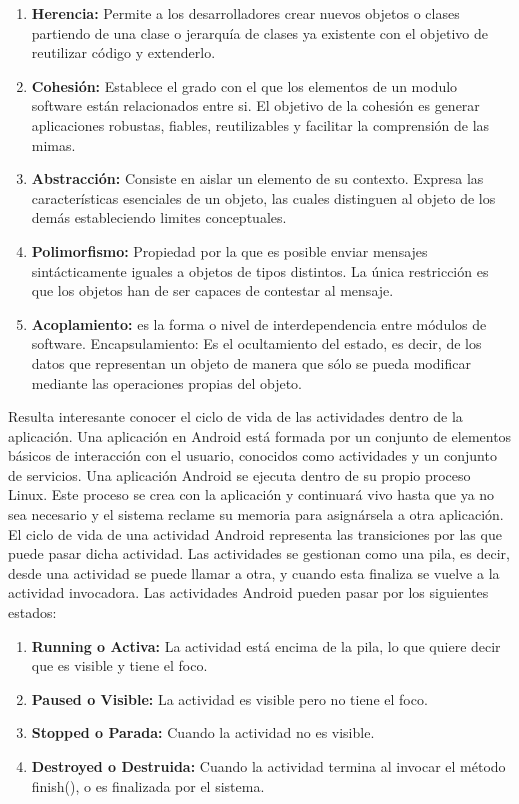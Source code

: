 \documentclass[a4paper,11pt]{book}
\begin{document}
\begin{enumerate}
\item \textbf{Herencia:} Permite a los desarrolladores crear nuevos objetos o clases partiendo de una clase o jerarquía de clases ya existente con el objetivo de reutilizar código y extenderlo. 
\item \textbf{Cohesión:} Establece el grado con el que los elementos de un modulo software están relacionados entre si. El objetivo de la cohesión es generar aplicaciones robustas, fiables, reutilizables y facilitar la comprensión de las mimas.
\item \textbf{Abstracción:} Consiste en aislar un elemento de su contexto. Expresa las características esenciales de un objeto, las cuales distinguen al objeto de los demás estableciendo limites conceptuales.
\item \textbf{Polimorfismo:} Propiedad por la que es posible enviar mensajes sintácticamente iguales a objetos de tipos distintos. La única restricción es que los objetos han de ser capaces de contestar al mensaje. 
\item \textbf{Acoplamiento:} es la forma o nivel de interdependencia entre módulos de software. 
 Encapsulamiento: Es el ocultamiento del estado, es decir, de los datos que representan un objeto de manera que sólo se pueda modificar mediante las operaciones propias del objeto.
\end{enumerate}


Resulta interesante conocer el ciclo de vida\cite{col} de las actividades dentro de la aplicación. Una aplicación en Android está formada por un conjunto de elementos básicos de interacción con el usuario, conocidos como actividades y un conjunto de servicios. Una aplicación Android se ejecuta dentro de su propio proceso Linux. Este proceso se crea con la aplicación y continuará vivo hasta que ya no sea necesario y el sistema reclame su memoria para asignársela a otra aplicación. El ciclo de vida de una actividad Android representa las transiciones por las que puede pasar dicha actividad. Las actividades se gestionan como una pila, es decir, desde una actividad se puede llamar a otra, y cuando esta finaliza se vuelve a la actividad invocadora. Las actividades Android pueden pasar por los siguientes estados:

\begin{enumerate}
\item \textbf{Running o Activa:} La actividad está encima de la pila, lo que quiere decir que es visible y tiene el foco.
\item \textbf{Paused o Visible:} La actividad es visible pero no tiene el foco. 
\item \textbf{Stopped o Parada:} Cuando la actividad no es visible. 
\item \textbf{Destroyed o Destruida:} Cuando la actividad termina al invocar el método finish(), o es finalizada por el sistema. 
\end{enumerate}
\end{document}
